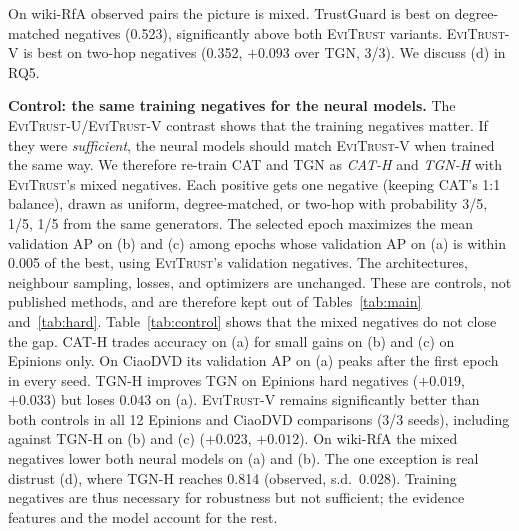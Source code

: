 \documentclass[conference]{IEEEtran}
\newcommand{\evi}{\textsc{EviTrust}}
\newcommand{\eviU}{\textsc{EviTrust}-U}
\newcommand{\eviV}{\textsc{EviTrust}-V}
\begin{document}
On wiki-RfA observed pairs the picture is mixed. TrustGuard is best on degree-matched negatives (0.523), significantly above both \evi{} variants. \eviV{} is best on two-hop negatives (0.352, $+0.093$ over TGN, 3/3). We discuss (d) in RQ5.

\textbf{Control: the same training negatives for the neural models.} The \eviU{}/\eviV{} contrast shows that the training negatives matter. If they were \emph{sufficient}, the neural models should match \eviV{} when trained the same way. We therefore re-train CAT and TGN as \emph{CAT-H} and \emph{TGN-H} with \evi{}'s mixed negatives. Each positive gets one negative (keeping CAT's 1:1 balance), drawn as uniform, degree-matched, or two-hop with probability 3/5, 1/5, 1/5 from the same generators. The selected epoch maximizes the mean validation AP on (b) and (c) among epochs whose validation AP on (a) is within 0.005 of the best, using \evi{}'s validation negatives. The architectures, neighbour sampling, losses, and optimizers are unchanged. These are controls, not published methods, and are therefore kept out of Tables~\ref{tab:main} and~\ref{tab:hard}.
Table~\ref{tab:control} shows that the mixed negatives do not close the gap. CAT-H trades accuracy on (a) for small gains on (b) and (c) on Epinions only. On CiaoDVD its validation AP on (a) peaks after the first epoch in every seed. TGN-H improves TGN on Epinions hard negatives ($+0.019$, $+0.033$) but loses $0.043$ on (a). \eviV{} remains significantly better than both controls in all 12 Epinions and CiaoDVD comparisons (3/3 seeds), including against TGN-H on (b) and (c) ($+0.023$, $+0.012$). On wiki-RfA the mixed negatives lower both neural models on (a) and (b). The one exception is real distrust (d), where TGN-H reaches 0.814 (observed, s.d.\ 0.028). Training negatives are thus necessary for robustness but not sufficient; the evidence features and the model account for the rest.
\end{document}
